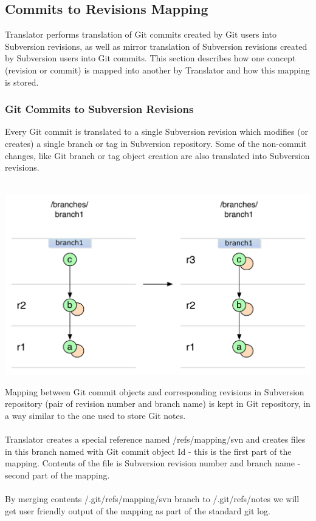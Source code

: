 \subsection{Commits to Revisions Mapping}
\renewcommand{\figurename}{Diagram}

Translator performs translation of Git commits created by Git users into Subversion revisions, as well
as mirror translation of Subversion revisions created by Subversion users into Git commits. This section
describes how one concept (revision or commit) is mapped into another by Translator and how this mapping 
is stored.

\subsubsection{Git Commits to Subversion Revisions}

Every Git commit is translated to a single Subversion revision which modifies (or creates) a single branch or tag
in Subversion repository. Some of the non-commit changes, like Git branch or tag object creation are also translated into Subversion revisions.\\\\
\begin{center}
\includegraphics[width=\textwidth]{img/diagrams/single_change_git_to_svn.pdf}%
\label{simple_git_to_svn}%
\end{center}

Mapping between Git commit objects and corresponding revisions in Subversion repository (pair of revision number and branch name) is 
kept in Git repository, in a way similar to the one used to store Git notes. 
\\\\
Translator creates a special reference named /refs/mapping/svn and creates files in this branch named with Git commit object Id - this is the first part of the mapping. 
Contents of the file is Subversion revision number and branch name - second part of the mapping.
\\\\ 
By merging contents /.git/refs/mapping/svn branch to /.git/refs/notes we will get user friendly output of the mapping as part of the standard git log.

